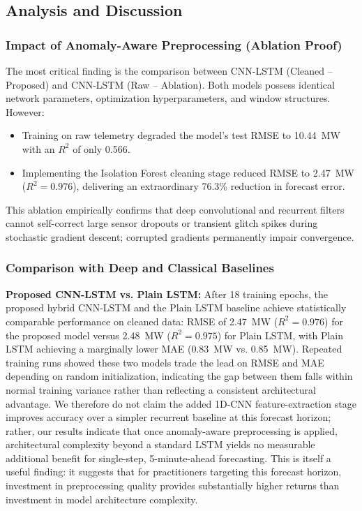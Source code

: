 \documentclass[conference]{IEEEtran}
\begin{document}
\subsection{Analysis and Discussion}

\subsubsection{Impact of Anomaly-Aware Preprocessing (Ablation Proof)}
The most critical finding is the comparison between CNN-LSTM (Cleaned -- Proposed) and CNN-LSTM (Raw -- Ablation). Both models possess identical network parameters, optimization hyperparameters, and window structures. However:
\begin{itemize}
    \item Training on raw telemetry degraded the model's test RMSE to 10.44~MW with an $R^2$ of only 0.566.
    \item Implementing the Isolation Forest cleaning stage reduced RMSE to 2.47~MW ($R^2 = 0.976$), delivering an extraordinary 76.3\% reduction in forecast error.
\end{itemize}
This ablation empirically confirms that deep convolutional and recurrent filters cannot self-correct large sensor dropouts or transient glitch spikes during stochastic gradient descent; corrupted gradients permanently impair convergence.

\subsubsection{Comparison with Deep and Classical Baselines}
\textbf{Proposed CNN-LSTM vs. Plain LSTM:} After 18 training epochs, the proposed hybrid CNN-LSTM and the Plain LSTM baseline achieve statistically comparable performance on cleaned data: RMSE of 2.47~MW ($R^2=0.976$) for the proposed model versus 2.48~MW ($R^2=0.975$) for Plain LSTM, with Plain LSTM achieving a marginally lower MAE (0.83~MW vs. 0.85~MW). Repeated training runs showed these two models trade the lead on RMSE and MAE depending on random initialization, indicating the gap between them falls within normal training variance rather than reflecting a consistent architectural advantage. We therefore do not claim the added 1D-CNN feature-extraction stage improves accuracy over a simpler recurrent baseline at this forecast horizon; rather, our results indicate that once anomaly-aware preprocessing is applied, architectural complexity beyond a standard LSTM yields no measurable additional benefit for single-step, 5-minute-ahead forecasting. This is itself a useful finding: it suggests that for practitioners targeting this forecast horizon, investment in preprocessing quality provides substantially higher returns than investment in model architecture complexity.
\end{document}

